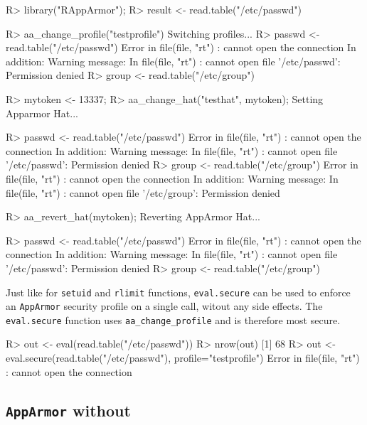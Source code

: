 \documentclass[article]{jss}
\newcommand{\AppArmor}{\texttt{AppArmor}\xspace}
\newcommand{\RAppArmor}{\pkg{RAppArmor}\xspace}
\begin{document}
\begin{CodeChunk}
\begin{CodeInput}
R> library("RAppArmor");
R> result <- read.table("/etc/passwd")

R> aa_change_profile("testprofile")
Switching profiles...
R> passwd <- read.table("/etc/passwd")
Error in file(file, "rt") : cannot open the connection
In addition: Warning message:
In file(file, "rt") : cannot open file '/etc/passwd': Permission denied
R> group <- read.table("/etc/group")

R> mytoken <- 13337;
R> aa_change_hat("testhat", mytoken);
Setting Apparmor Hat...

R> passwd <- read.table("/etc/passwd")
Error in file(file, "rt") : cannot open the connection
In addition: Warning message:
In file(file, "rt") : cannot open file '/etc/passwd': Permission denied
R> group <- read.table("/etc/group")
Error in file(file, "rt") : cannot open the connection
In addition: Warning message:
In file(file, "rt") : cannot open file '/etc/group': Permission denied

R> aa_revert_hat(mytoken);
Reverting AppArmor Hat...

R> passwd <- read.table("/etc/passwd")
Error in file(file, "rt") : cannot open the connection
In addition: Warning message:
In file(file, "rt") : cannot open file '/etc/passwd': Permission denied
R> group <- read.table("/etc/group")
\end{CodeInput}
\end{CodeChunk}

Just like for \texttt{setuid} and \texttt{rlimit} functions,
\texttt{eval.secure} can be used to enforce an \AppArmor security profile on a
single call, witout any side effects. The \texttt{eval.secure} function uses
\texttt{aa\_change\_profile} and is therefore most secure.

\begin{CodeChunk}
\begin{CodeInput}
R> out <- eval(read.table("/etc/passwd"))
R> nrow(out)
[1] 68
R> out <- eval.secure(read.table("/etc/passwd"), profile="testprofile")
Error in file(file, "rt") : cannot open the connection
\end{CodeInput}
\end{CodeChunk}

\subsection[AppArmor without RAppArmor]{\AppArmor without \RAppArmor}
\label{usr.bin.r}
\end{document}
